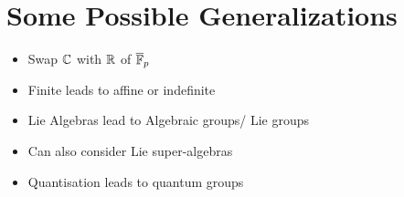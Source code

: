 \hypertarget{some-possible-generalizations}{%
\section{Some Possible
Generalizations}\label{some-possible-generalizations}}

\begin{itemize}
\tightlist
\item
  Swap \({\mathbb{C}}\) with \({\mathbb{R}}\) of \(\overline {{\mathbb{F}}}_p\)
\item
  Finite leads to affine or indefinite
\item
  Lie Algebras lead to Algebraic groups/ Lie groups
\item
  Can also consider Lie super-algebras
\item
  Quantisation leads to quantum groups
\end{itemize}





